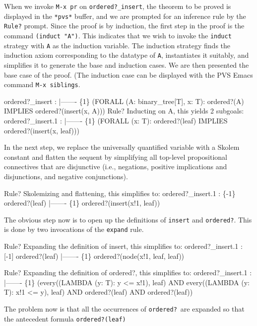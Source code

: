 \documentclass[11pt,twoside]{book}
\begin{document}
When we invoke \texttt{M-x pr} on \texttt{ordered?\_insert}, the theorem to
be proved is displayed in the \texttt{*pvs*} buffer, and we are prompted
for an inference rule by the \texttt{Rule?} prompt.  Since the proof is by
induction, the first 
step in the proof is the command \texttt{(induct "A")}\@.  This indicates
that we wish to invoke the \texttt{induct} strategy with \texttt{A} as the
induction variable.  The induction strategy finds the induction axiom
corresponding to the datatype of \texttt{A}, instantiates it suitably, and
simplifies it to generate the base and induction cases.  We are then
presented the base case of the proof.  (The induction case can be
displayed with the PVS Emacs command \texttt{M-x~siblings}\@. 
\begin{session*}
 ordered?_insert :  
  |-------
\{1\}   (FORALL (A: binary_tree[T], x: T):
         ordered?(A) IMPLIES ordered?(insert(x, A)))
Rule? 
Inducting on A,
this yields  2 subgoals: 
ordered?_insert.1 :  
  |-------
\{1\}   (FORALL (x: T): ordered?(leaf) IMPLIES ordered?(insert(x, leaf)))
\end{session*}
In the next  step, we replace the universally quantified variable
with a Skolem constant and flatten the sequent by simplifying all
top-level propositional connectives that are disjunctive (i.e.,
negations, positive implications and disjunctions, and negative
conjunctions).  
\begin{session*}
Rule? 
Skolemizing and flattening,
this simplifies to: 
ordered?_insert.1 :  
\{-1\}   ordered?(leaf)
  |-------
\{1\}   ordered?(insert(x!1, leaf))
\end{session*}
The obvious step now is to open up the definitions of \texttt{insert} and
\texttt{ordered?}\@.  This is done by two invocations of the
\texttt{expand} rule.
\begin{session*}
Rule? 
Expanding the definition of insert,
this simplifies to: 
ordered?_insert.1 :  
[-1]   ordered?(leaf)
  |-------
\{1\}   ordered?(node(x!1, leaf, leaf))

Rule? 
Expanding the definition of ordered?,
this simplifies to: 
ordered?_insert.1 :  
  |-------
\{1\}   (every((LAMBDA (y: T): y <= x!1), leaf)
           AND every((LAMBDA (y: T): x!1 <= y), leaf)
             AND ordered?(leaf) AND ordered?(leaf))
\end{session*}
The problem now is that all the occurrences of \texttt{ordered?}\ are expanded
so that the antecedent formula \texttt{ordered?(leaf)}
\end{document}
